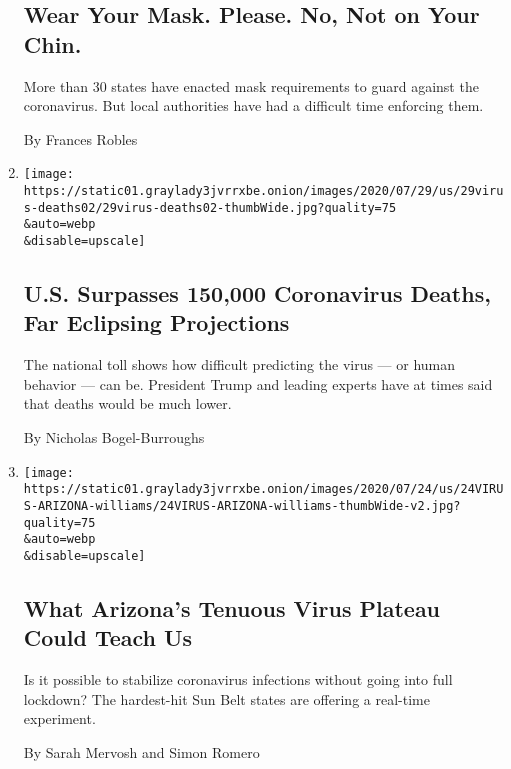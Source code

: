 \begin{enumerate}
{  \subsection{Wear Your Mask. Please. No, Not on Your
  Chin.}\label{wear-your-mask-please-no-not-on-your-chin}}

  More than 30 states have enacted mask requirements to guard against
  the coronavirus. But local authorities have had a difficult time
  enforcing them.

  By Frances Robles
\item
  \href{/2020/07/29/us/coronavirus-deaths-150000.html}{}

  \texttt{[image: https://static01.graylady3jvrrxbe.onion/images/2020/07/29/us/29virus-deaths02/29virus-deaths02-thumbWide.jpg?quality=75\\\&auto=webp\\\&disable=upscale]}

  \hypertarget{us-surpasses-150000-coronavirus-deaths-far-eclipsing-projections}{%
  \subsection{U.S. Surpasses 150,000 Coronavirus Deaths, Far Eclipsing
  Projections}\label{us-surpasses-150000-coronavirus-deaths-far-eclipsing-projections}}

  The national toll shows how difficult predicting the virus --- or
  human behavior --- can be. President Trump and leading experts have at
  times said that deaths would be much lower.

  By Nicholas Bogel-Burroughs
\item
  \href{/2020/07/24/us/coronavirus-arizona.html}{}

  \texttt{[image: https://static01.graylady3jvrrxbe.onion/images/2020/07/24/us/24VIRUS-ARIZONA-williams/24VIRUS-ARIZONA-williams-thumbWide-v2.jpg?quality=75\\\&auto=webp\\\&disable=upscale]}

  \hypertarget{what-arizonas-tenuous-virus-plateau-could-teach-us}{%
  \subsection{What Arizona's Tenuous Virus Plateau Could Teach
  Us}\label{what-arizonas-tenuous-virus-plateau-could-teach-us}}

  Is it possible to stabilize coronavirus infections without going into
  full lockdown? The hardest-hit Sun Belt states are offering a
  real-time experiment.

  By Sarah Mervosh and Simon Romero
\end{enumerate}


